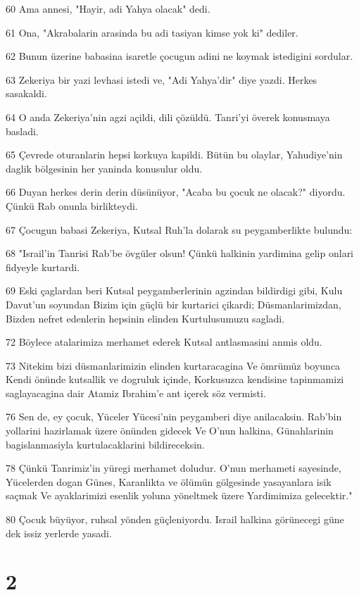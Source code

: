 \par 60 Ama annesi, "Hayir, adi Yahya olacak" dedi.
\par 61 Ona, "Akrabalarin arasinda bu adi tasiyan kimse yok ki" dediler.
\par 62 Bunun üzerine babasina isaretle çocugun adini ne koymak istedigini sordular.
\par 63 Zekeriya bir yazi levhasi istedi ve, "Adi Yahya'dir" diye yazdi. Herkes sasakaldi.
\par 64 O anda Zekeriya'nin agzi açildi, dili çözüldü. Tanri'yi överek konusmaya basladi.
\par 65 Çevrede oturanlarin hepsi korkuya kapildi. Bütün bu olaylar, Yahudiye'nin daglik bölgesinin her yaninda konusulur oldu.
\par 66 Duyan herkes derin derin düsünüyor, "Acaba bu çocuk ne olacak?" diyordu. Çünkü Rab onunla birlikteydi.
\par 67 Çocugun babasi Zekeriya, Kutsal Ruh'la dolarak su peygamberlikte bulundu:
\par 68 "Israil'in Tanrisi Rab'be övgüler olsun! Çünkü halkinin yardimina gelip onlari fidyeyle kurtardi.
\par 69 Eski çaglardan beri Kutsal peygamberlerinin agzindan bildirdigi gibi, Kulu Davut'un soyundan Bizim için güçlü bir kurtarici çikardi; Düsmanlarimizdan, Bizden nefret edenlerin hepsinin elinden Kurtulusumuzu sagladi.
\par 72 Böylece atalarimiza merhamet ederek Kutsal antlasmasini anmis oldu.
\par 73 Nitekim bizi düsmanlarimizin elinden kurtaracagina Ve ömrümüz boyunca Kendi önünde kutsallik ve dogruluk içinde, Korkusuzca kendisine tapinmamizi saglayacagina dair Atamiz Ibrahim'e ant içerek söz vermisti.
\par 76 Sen de, ey çocuk, Yüceler Yücesi'nin peygamberi diye anilacaksin. Rab'bin yollarini hazirlamak üzere önünden gidecek Ve O'nun halkina, Günahlarinin bagislanmasiyla kurtulacaklarini bildireceksin.
\par 78 Çünkü Tanrimiz'in yüregi merhamet doludur. O'nun merhameti sayesinde, Yücelerden dogan Günes, Karanlikta ve ölümün gölgesinde yasayanlara isik saçmak Ve ayaklarimizi esenlik yoluna yöneltmek üzere Yardimimiza gelecektir."
\par 80 Çocuk büyüyor, ruhsal yönden güçleniyordu. Israil halkina görünecegi güne dek issiz yerlerde yasadi.

\chapter{2}

